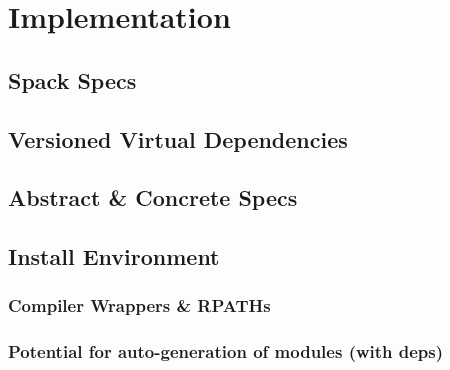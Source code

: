 
\section{Implementation}
\label{sec:implementation}



\subsection{Spack Specs}
	
\subsection{Versioned Virtual Dependencies}

\subsection{Abstract \& Concrete Specs}
	
\subsection{Install Environment}

\subsubsection{Compiler Wrappers \& RPATHs}

\subsubsection{Potential for auto-generation of modules (with deps)}

